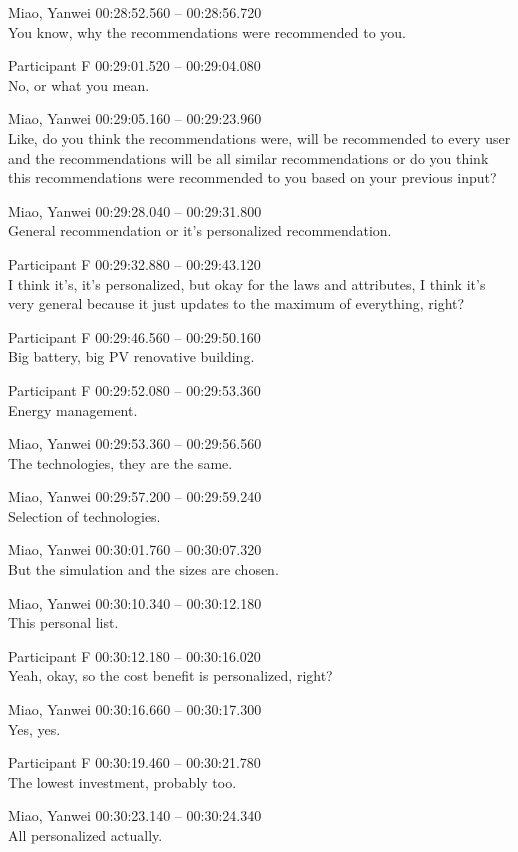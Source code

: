 {Miao, Yanwei 00:28:52.560 -- 00:28:56.720 \\
You know, why the recommendations were recommended to you.

Participant F 00:29:01.520 -- 00:29:04.080 \\
No, or what you mean.

Miao, Yanwei 00:29:05.160 -- 00:29:23.960 \\
Like, do you think the recommendations were, will be recommended to every user and the recommendations will be all similar recommendations or do you think this recommendations were recommended to you based on your previous input?

Miao, Yanwei 00:29:28.040 -- 00:29:31.800 \\
General recommendation or it's personalized recommendation.

Participant F 00:29:32.880 -- 00:29:43.120 \\
I think it's, it's personalized, but okay for the laws and attributes, I think it's very general because it just updates to the maximum of everything, right?

Participant F 00:29:46.560 -- 00:29:50.160 \\
Big battery, big PV renovative building.

Participant F 00:29:52.080 -- 00:29:53.360 \\
Energy management.

Miao, Yanwei 00:29:53.360 -- 00:29:56.560 \\
The technologies, they are the same.

Miao, Yanwei 00:29:57.200 -- 00:29:59.240 \\
Selection of technologies.

Miao, Yanwei 00:30:01.760 -- 00:30:07.320 \\
But the simulation and the sizes are chosen.

Miao, Yanwei 00:30:10.340 -- 00:30:12.180 \\
This personal list.

Participant F 00:30:12.180 -- 00:30:16.020 \\
Yeah, okay, so the cost benefit is personalized, right?

Miao, Yanwei 00:30:16.660 -- 00:30:17.300 \\
Yes, yes.

Participant F 00:30:19.460 -- 00:30:21.780 \\
The lowest investment, probably too.

Miao, Yanwei 00:30:23.140 -- 00:30:24.340 \\
All personalized actually.

}
